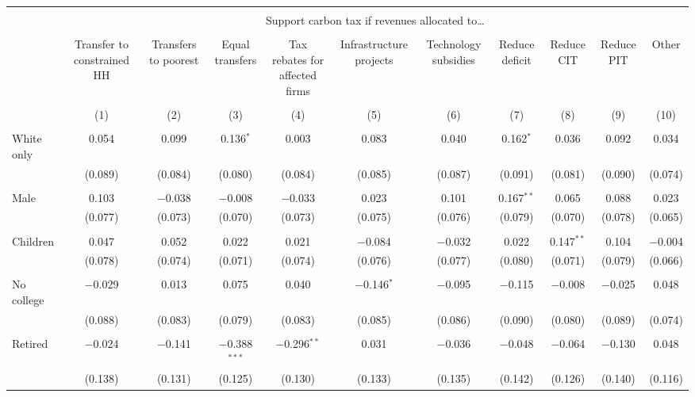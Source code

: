 
\begin{tabular}{@{\extracolsep{5pt}}lcccccccccc} 
\\[-1.8ex]\hline 
\hline \\[-1.8ex] 
 & \multicolumn{10}{c}{Support carbon tax if revenues allocated to…} \\ 
\cline{2-11} 
\\[-1.8ex] & Transfer to constrained HH & Transfers to poorest & Equal transfers & Tax rebates for affected firms & Infrastructure projects & Technology subsidies & Reduce deficit & Reduce CIT & Reduce PIT & Other \\ 
\\[-1.8ex] & (1) & (2) & (3) & (4) & (5) & (6) & (7) & (8) & (9) & (10)\\ 
\hline \\[-1.8ex] 
 White only & 0.054 & 0.099 & 0.136$^{*}$ & 0.003 & 0.083 & 0.040 & 0.162$^{*}$ & 0.036 & 0.092 & 0.034 \\ 
  & (0.089) & (0.084) & (0.080) & (0.084) & (0.085) & (0.087) & (0.091) & (0.081) & (0.090) & (0.074) \\ 
  & & & & & & & & & & \\ 
 Male & 0.103 & $-$0.038 & $-$0.008 & $-$0.033 & 0.023 & 0.101 & 0.167$^{**}$ & 0.065 & 0.088 & 0.023 \\ 
  & (0.077) & (0.073) & (0.070) & (0.073) & (0.075) & (0.076) & (0.079) & (0.070) & (0.078) & (0.065) \\ 
  & & & & & & & & & & \\ 
 Children & 0.047 & 0.052 & 0.022 & 0.021 & $-$0.084 & $-$0.032 & 0.022 & 0.147$^{**}$ & 0.104 & $-$0.004 \\ 
  & (0.078) & (0.074) & (0.071) & (0.074) & (0.076) & (0.077) & (0.080) & (0.071) & (0.079) & (0.066) \\ 
  & & & & & & & & & & \\ 
 No college & $-$0.029 & 0.013 & 0.075 & 0.040 & $-$0.146$^{*}$ & $-$0.095 & $-$0.115 & $-$0.008 & $-$0.025 & 0.048 \\ 
  & (0.088) & (0.083) & (0.079) & (0.083) & (0.085) & (0.086) & (0.090) & (0.080) & (0.089) & (0.074) \\ 
  & & & & & & & & & & \\ 
 Retired & $-$0.024 & $-$0.141 & $-$0.388$^{***}$ & $-$0.296$^{**}$ & 0.031 & $-$0.036 & $-$0.048 & $-$0.064 & $-$0.130 & 0.048 \\ 
  & (0.138) & (0.131) & (0.125) & (0.130) & (0.133) & (0.135) & (0.142) & (0.126) & (0.140) & (0.116) \\ 

\end{tabular}
